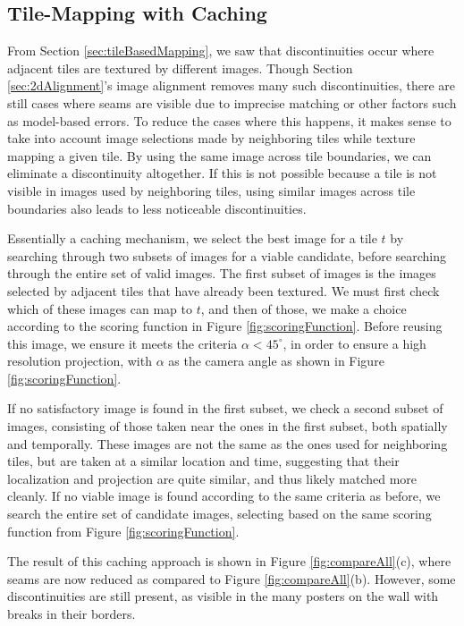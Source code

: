 \documentclass[]{spie}  %
\begin{document}
\subsection{Tile-Mapping with Caching}
\label{sec:mappingWithCaching}
From Section \ref{sec:tileBasedMapping}, we saw that discontinuities
occur where adjacent tiles are textured by different images. Though
Section \ref{sec:2dAlignment}'s image alignment removes many such
discontinuities, there are still cases where seams are visible due to
imprecise matching or other factors such as model-based errors. To
reduce the cases where this happens, it makes sense to take into
account image selections made by neighboring tiles while texture
mapping a given tile. By using the same image across tile boundaries,
we can eliminate a discontinuity altogether. If this is not possible
because a tile is not visible in images used by neighboring tiles,
using similar images across tile boundaries also leads to less
noticeable discontinuities.

Essentially a caching mechanism, we select the best image for a tile
$t$ by searching through two subsets of images for a viable candidate,
before searching through the entire set of valid images. The first
subset of images is the images selected by adjacent tiles that have
already been textured. We must first check which of these images can
map to $t$, and then of those, we make a choice according to the
scoring function in Figure \ref{fig:scoringFunction}. Before reusing
this image, we ensure it meets the criteria $\alpha < 45^\circ$, in
order to ensure a high resolution projection, with $\alpha$ as the
camera angle as shown in Figure \ref{fig:scoringFunction}.

If no satisfactory image is found in the first subset, we check a
second subset of images, consisting of those taken near the ones in
the first subset, both spatially and temporally. These images are not
the same as the ones used for neighboring tiles, but are taken at a
similar location and time, suggesting that their localization and
projection are quite similar, and thus likely matched more cleanly. If
no viable image is found according to the same criteria as before, we
search the entire set of candidate images, selecting based on the same
scoring function from Figure \ref{fig:scoringFunction}.

The result of this caching approach is shown in Figure
\ref{fig:compareAll}(c), where seams are now reduced as compared to
Figure \ref{fig:compareAll}(b). However, some discontinuities are
still present, as visible in the many posters on the wall with breaks
in their borders.
\end{document}
